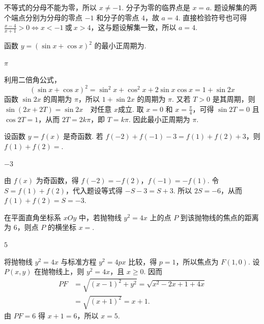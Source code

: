 \begin{solution}
不等式的分母不能为零，所以 \(x\neq-1\). 分子为零的临界点是 \(x=a\). 题设解集的两个端点分别为分母的零点 \(-1\) 和分子的零点 \(4\)，故 \(a=4\). 直接检验符号也可得 \(\frac{x-4}{x+1}>0\Longleftrightarrow x<-1\ \text{或}\ x>4\)，这与题设解集一致，所以 \(a=4\).
\end{solution}

\begin{problem}
函数 \(y=(\sin x+\cos x)^2\) 的最小正周期为\fillinblank{}.
\end{problem}

\begin{answer}
\(\pi\)
\end{answer}

\begin{solution}
利用二倍角公式，\[(\sin x+\cos x)^2=\sin^2x+\cos^2x+2\sin x\cos x=1+\sin2x\]
函数 \(\sin2x\) 的周期为 \(\pi\)，所以 \(1+\sin2x\) 的周期为 \(\pi\). 又若 \(T>0\) 是其周期，则
\(\sin(2x+2T)=\sin2x\quad\text{对任意 }x\text{成立}\).
取 \(x=0\) 和 \(x=\frac{\pi}{4}\)，可得 \(\sin2T=0\) 且 \(\cos2T=1\)，从而 \(2T=2k\pi\)，即 \(T=k\pi\). 因此最小正周期为 \(\pi\).
\end{solution}

\begin{problem}
设函数 \(y=f(x)\) 是奇函数. 若 \(f(-2)+f(-1)-3=f(1)+f(2)+3\)，则 \(f(1)+f(2)=\)\fillinblank{}.
\end{problem}

\begin{answer}
\(-3\)
\end{answer}

\begin{solution}
由 \(f(x)\) 为奇函数，得 \(f(-2)=-f(2)\)，\(f(-1)=-f(1)\). 令 \(S=f(1)+f(2)\)，代入题设等式得 \(-S-3=S+3\). 所以 \(2S=-6\)，从而 \(f(1)+f(2)=S=-3\).
\end{solution}

\begin{problem}
在平面直角坐标系 \(xOy\) 中，若抛物线 \(y^2=4x\) 上的点 \(P\) 到该抛物线的焦点的距离为 \(6\)，则点 \(P\) 的横坐标 \(x=\)\fillinblank{}.
\end{problem}

\begin{answer}
\(5\)
\end{answer}

\begin{solution}
将抛物线 \(y^2=4x\) 与标准方程 \(y^2=4px\) 比较，得 \(p=1\)，所以焦点为 \(F(1,0)\). 设 \(P(x,y)\) 在抛物线上，则 \(y^2=4x\)，且 \(x\geqslant0\). 因而
\[\begin{aligned}PF&=\sqrt{(x-1)^2+y^2}=\sqrt{x^2-2x+1+4x}\\&=\sqrt{(x+1)^2}=x+1.\end{aligned}\]
由 \(PF=6\) 得 \(x+1=6\)，所以 \(x=5\).
\end{solution}

